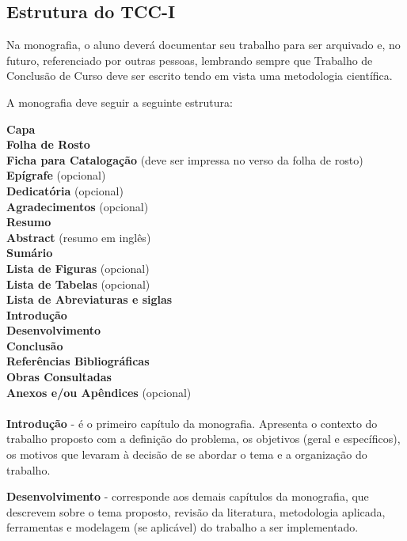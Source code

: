 \subsection{Estrutura do TCC-I}

Na monografia, o aluno deverá documentar seu trabalho para ser arquivado e, no futuro, referenciado por outras pessoas, lembrando sempre que Trabalho de Conclusão de Curso deve ser escrito tendo em vista uma metodologia científica. 

A monografia deve seguir a seguinte estrutura: 
	
	\indent \textbf{Capa} \\
	\indent \textbf{Folha de Rosto} \\
	\indent \textbf{Ficha para Catalogação} (deve ser impressa no verso da folha de rosto) \\
	\indent \textbf{Epígrafe} (opcional) \\
	\indent \textbf{Dedicatória} (opcional) \\
	\indent \textbf{Agradecimentos} (opcional) \\
	\indent \textbf{Resumo} \\
	\indent \textbf{Abstract} (resumo em inglês) \\
	\indent \textbf{Sumário} \\
	\indent \textbf{Lista de Figuras} (opcional) \\
	\indent \textbf{Lista de Tabelas} (opcional) \\
	\indent \textbf{Lista de Abreviaturas e siglas} \\
	\indent \textbf{Introdução} \\
	\indent \textbf{Desenvolvimento} \\
	\indent \textbf{Conclusão} \\
	\indent \textbf{Referências Bibliográficas} \\
	\indent \textbf{Obras Consultadas} \\
	\indent \textbf{Anexos e/ou Apêndices} (opcional) \\\\

\textbf{Introdução} - é o primeiro capítulo da monografia. Apresenta o contexto do trabalho proposto com a definição do problema, os objetivos (geral e específicos), os motivos que levaram à decisão de se abordar o tema e a organização do trabalho.

\textbf{Desenvolvimento} - corresponde aos demais capítulos da monografia, que descrevem sobre o tema proposto, revisão da literatura, metodologia aplicada, ferramentas e modelagem (se aplicável) do trabalho a ser implementado.


